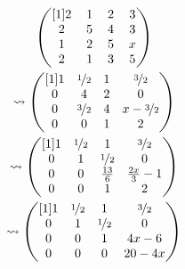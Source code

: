 \documentclass[main.tex]{subfiles}
\begin{document}
\begin{gather*}
    \arraycolsep=0.6em
    \begin{pmatrix}[1]
        2 & 1 & 2 & 3 \\
        2 & 5 & 4 & 3 \\
        1 & 2 & 5 & x \\
        2 & 1 & 3 & 5
    \end{pmatrix}\\
    \rightsquigarrow
    \begin{pmatrix}[1]
        1 & \nicefrac{1}{2} & 1 & \nicefrac{3}{2} \\
        0 &   4 & 2 &   0 \\
        0 & \nicefrac{3}{2} & 4 & x - \nicefrac{3}{2} \\
        0 &   0 & 1 &   2
    \end{pmatrix}\\
    \rightsquigarrow
    \begin{pmatrix}[1]
        1 & \nicefrac{1}{2} & 1 & \nicefrac{3}{2} \\
        0 & 1 & \nicefrac{1}{2} & 0 \\
        0 & 0 & \frac{13}{6} & \frac{2x}{3} - 1 \\
        0 & 0 & 1 & 2
    \end{pmatrix}\\
    \rightsquigarrow
    \begin{pmatrix}[1]
        1 & \nicefrac{1}{2} & 1 & \nicefrac{3}{2} \\
        0 & 1 & \nicefrac{1}{2} & 0 \\
        0 & 0 & 1 & 4x - 6 \\
        0 & 0 & 0 & 20 - 4x
    \end{pmatrix}
\end{gather*}

\end{document}

